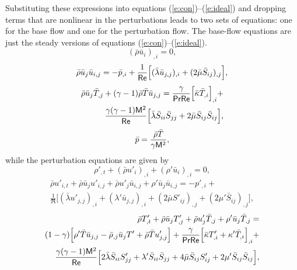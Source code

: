 Substituting these expressions into equations (\ref{e:con})--(\ref{e:ideal})
and dropping terms that are nonlinear in the perturbations leads to two sets
of equations: one for the base flow and one for the perturbation flow.  The
base-flow equations are just the steady versions of equations
(\ref{e:con})--(\ref{e:ideal}).
%
  \begin{equation} \label{e:bcon}
    \left(\bar\rho \bar u_i \right)_{,i} = 0 ,
  \end{equation}
  \begin{equation} \label{e:bmom}
    \bar\rho \bar u_{j} \bar u_{i,j} =  -\bar p_{,i} + 
    {1\over{\Re}}\Big[(\bar\lambda \bar u_{j,j})_{,i} + 
    (2 \bar\mu \bar S_{ij})_{,j}\Big] ,
  \end{equation}
  \begin{eqnarray} \label{e:beng}
    \bar\rho \bar u_{j} \bar T_{,j} + 
    (\gamma - 1) \bar\rho \bar T \bar u_{j,j} =  
    \frac{\gamma}{\Pr\Re} \Big[ \bar\kappa \bar T_{,i} \Big]_{,i} + 
    \nonumber \\
    {{\gamma (\gamma-1) \M^2}\over{\Re}} 
    \Big[ \bar \lambda \bar S_{ii} \bar S_{jj} + 
    2 \bar \mu \bar S_{ij} \bar S_{ij} \Big] ,
  \end{eqnarray}
  \begin{equation} \label{e:bideal}
    \bar p = \frac{\bar\rho \bar T}{\gamma \M^2} ,
  \end{equation}
%
while the perturbation equations are given by
%
  \begin{equation} \label{e:pcon}
    \rho'_{,t} + \left(\bar\rho u'_i \right)_{,i} + 
    \left(\rho' \bar u_i \right)_{,i}= 0	,
  \end{equation}
  \begin{eqnarray} \label{e:pmom}
    \bar\rho u'_{i,t} + \bar\rho \bar u_{j} u'_{i,j} + 
    \bar\rho u'_{j} \bar u_{i,j} + \rho' \bar u_{j} \bar u_{i,j} =
    -p'_{,i} + \nonumber \\
    \frac{1}{\Re}\Big[(\bar\lambda u'_{j,j})_{,i} +
                      (\lambda' \bar u_{j,j})_{,i} + 
                      (2 \bar\mu S'_{ij})_{,j} + 
		      (2 \mu' \bar S_{ij})_{,j} \Big]	,
  \end{eqnarray}
%
%
%
  \begin{eqnarray} \label{e:peng}
    \bar\rho T'_{,t} + \bar\rho \bar u_{j} T'_{,j} + 
              \bar\rho u'_{j} \bar T_{,j} + 
              \rho' \bar u_{j} \bar T_{,j} =
    \nonumber \\
    (1 - \gamma) \Big[ \rho' \bar T \bar u_{j,j} - 
                     \bar \rho_{,j} \bar u_j T' +
                     \bar \rho \bar T u'_{j,j} \Big] +
    \frac{\gamma}{\Pr\Re} \Big[ \bar\kappa T'_{,i} + 
                          \kappa' \bar T_{,i} \Big]_{,i} +
    \nonumber \\
    {{\gamma(\gamma-1) \M^2}\over{\Re}}
    \Big[ 2 \bar \lambda \bar S_{ii} S'_{jj} + 
          \lambda' \bar S_{ii} \bar S_{jj} +
          4 \bar \mu \bar S_{ij} S'_{ij} +
          2 \mu' \bar S_{ij} \bar S_{ij} \Big] ,
  \end{eqnarray}
